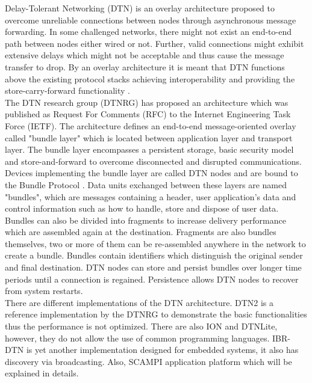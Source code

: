 Delay-Tolerant Networking (DTN) is an overlay architecture proposed to overcome unreliable connections between nodes through asynchronous message forwarding. In some challenged networks, there might not exist an end-to-end path between nodes either wired or not. Further, valid connections might exhibit extensive delays which might not be acceptable and thus cause the message transfer to drop. By an overlay architecture it is meant that DTN functions above the existing protocol stacks achieving interoperability and providing the store-carry-forward functionality \cite{Fall:2003:DNA:863955.863960}.\\

\noindent The DTN research group (DTNRG) has proposed an architecture which was published as Request For Comments (RFC) to the Internet Engineering Task Force (IETF). The architecture defines an end-to-end message-oriented overlay called "bundle layer" which is located  between  application layer and  transport layer. The bundle layer encompasses a persistent storage, basic security model and store-and-forward to overcome disconnected and disrupted communications. Devices implementing the bundle layer are called DTN nodes and are bound to the Bundle Protocol \cite{scott2007bundle}. Data units exchanged between these layers are named "bundles",  which are messages containing a header, user application's data and control information such as how to handle, store and dispose of user data. Bundles can also be divided into fragments  to increase delivery performance which are assembled again at the destination. Fragments are also bundles themselves, two or more of them can be re-assembled anywhere in the network to create a bundle. Bundles contain identifiers which distinguish the original sender and final destination. DTN nodes can store and persist bundles over longer time periods until a connection is regained.  Persistence allows DTN nodes to recover from system restarts\cite{fall2007delay}.\\


\noindent There are different implementations of the DTN architecture. DTN2 is a reference implementation by the DTNRG to demonstrate the basic functionalities thus the performance is not optimized. There are also ION and DTNLite, however, they do not allow the use of common programming languages. IBR-DTN is yet another implementation designed for embedded systems, it also has discovery via broadcasting\cite{Doering:2008:IEI:1409985.1410008}. Also, SCAMPI application platform which will be explained in details.




